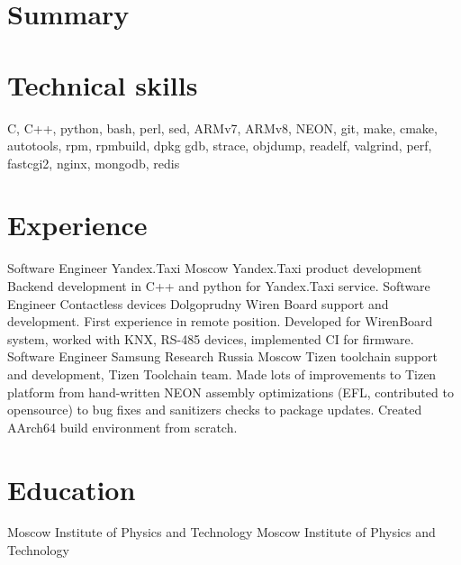 \documentclass[12pt,a4paper]{moderncv}
\begin{document}
\makecvtitle
\section{Summary}

\section{Technical skills}
\cvline
  {}{C, C++, python, bash, perl, sed,
  ARMv7, ARMv8, NEON,
  git, make, cmake, autotools,
  rpm, rpmbuild, dpkg
  gdb, strace, objdump, readelf,
  valgrind, perf,
  fastcgi2, nginx, mongodb, redis
}

\section{Experience}
 {Software Engineer} {Yandex.Taxi} {Moscow} {}
        {Yandex.Taxi product development\newline{}
        Backend development in C++ and python for Yandex.Taxi service.
}
 {Software Engineer} {Contactless devices} {Dolgoprudny} {}
        {Wiren Board support and development.\newline{}
        First experience in remote position. Developed for WirenBoard system, worked with KNX,
        RS-485 devices, implemented CI for firmware.
}
 {Software Engineer} {Samsung Research Russia} {Moscow} {}
        {Tizen toolchain support and development, Tizen Toolchain team.\newline{}
        Made lots of improvements to Tizen platform from hand-written NEON assembly optimizations
        (EFL, contributed to opensource\footnotemark[1]) to bug fixes and sanitizers checks to package updates.
        Created AArch64 build environment from scratch.
}

\section{Education}
\label{sec:edu}
        {Moscow Institute of Physics and Technology}{}{}{}
        {Moscow Institute of Physics and Technology}{}{}{}

\end{document}
